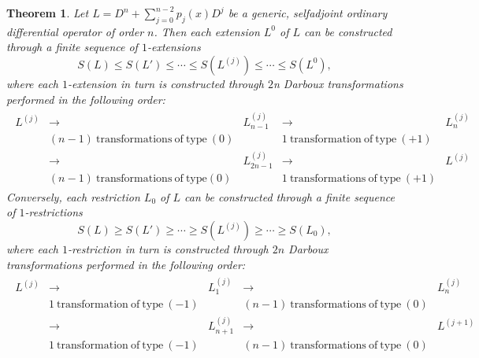 \documentclass{surv-l}
\theoremstyle{plain}
\newtheorem{theorem}{Theorem}[section]
\theoremstyle{definition}
\numberwithin{equation}{chapter}
\begin{document}
\begin{theorem}\label{thm37.19}
Let $L=D^{n} + \sum_{j=0}^{n-2}p_{j}(x)D^{j}$ be a generic, selfadjoint ordinary differential operator of order $n$. Then each extension $L^{0}$ of $L$ can be constructed through a finite sequence of $1$-extensions
\setcounter{equation}{19}
\begin{equation}\label{eq37.20}
 S(L)\leq S(L')\leq\cdots\leq S(L^{(j)})\leq\cdots\leq S(L^{0}),
\end{equation}
where each $1$-extension in turn is constructed through $2$n Darboux transformations performed in the following order\emph{:}
\begin{align}\label{eq37.21}
\begin{array}{ccccc}
  L^{(j)} & \rightarrow & L_{n-1}^{(j)} & \rightarrow & L_{n}^{(j)} \\
   & (n-1)\ \mathrm{transformations\ of\ type\ (0)} &  & 1\ \mathrm{transformation\ of\ type}\ (+1) &  \\
   & \rightarrow & L_{2n-1}^{(j)} & \rightarrow & L^{(j)} \\
   & (n-1)\ \mathrm{transformations\ of\ type} (0) &  & 1\ \mathrm{transformations\ of\ type}\ (+1) &
\end{array}
\end{align}
Conversely, each restriction $L_{0}$ of $L$ can be constructed through a finite sequence of $1$-{restrictions}
\begin{equation}\label{eq37.22}
 S(L)\geq S(L')\geq\cdots \geq S(L^{(j)})\geq\cdots \geq S(L_{0}),
\end{equation}
where each $1$-restriction in turn is constructed through $2n$ Darboux transformations performed in the following order\emph{:}
\begin{align}\label{eq37.23}
\begin{array}{ccccc}
  L^{(j)} & \rightarrow & L_{1}^{(j)} & \rightarrow & L_{n}^{(j)} \\
   & 1 \ \mathrm{transformation\ of\ type}\ (-1) &  & (n-1)\ \mathrm{transformations\ of\ type}\ (0) &  \\
   & \rightarrow & L_{n+1}^{(j)} & \rightarrow & L^{(j+1)} \\
   & 1\ \mathrm{transformation\ of\ type}\ (-1) &  & (n-1) \ \mathrm{transformations\ of\ type}\ (0) &
\end{array}
\end{align}
\end{theorem}
\end{document}
